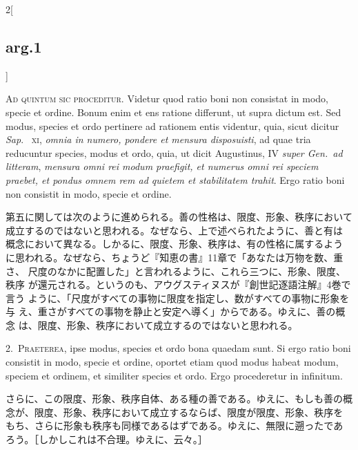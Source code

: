 \documentclass[paper=a4paper,fontsize=10pt,jafontsize=9pt,titlepage]{jlreq}
\begin{document}
\begin{paracol}{2}[\subsection{arg.1}]

{\huge A}{\scshape d quintum sic proceditur}. Videtur quod ratio boni
 non consistat in modo, specie et ordine. Bonum enim et ens ratione
 differunt, ut supra dictum est. Sed modus, species et ordo pertinere ad
 rationem entis videntur, quia, sicut dicitur {\itshape Sap}.~{\scshape
 xi}, {\itshape omnia in numero, pondere et mensura disposuisti}, ad
 quae tria reducuntur species, modus et ordo, quia, ut dicit Augustinus,
 IV {\itshape super Gen.~ad litteram}, {\itshape mensura omni rei modum
 praefigit, et numerus omni rei speciem praebet, et pondus omnem rem ad
 quietem et stabilitatem trahit}. Ergo ratio boni non consistit in modo,
 specie et ordine.

\switchcolumn

第五に関しては次のように進められる。善の性格は、限度、形象、秩序において
 成立するのではないと思われる。なぜなら、上で述べられたように、善と有は
 概念において異なる。しかるに、限度、形象、秩序は、有の性格に属するよう
 に思われる。なぜなら、ちょうど『知恵の書』11章で「あなたは万物を数、重さ、
 尺度のなかに配置した」と言われるように、これら三つに、形象、限度、秩序
 が還元される。というのも、アウグスティヌスが『創世記逐語注解』4巻で言う
 ように、「尺度がすべての事物に限度を指定し、数がすべての事物に形象を与
 え、重さがすべての事物を静止と安定へ導く」からである。ゆえに、善の概念
 は、限度、形象、秩序において成立するのではないと思われる。


2.~{\scshape Praeterea}, ipse modus, species et ordo bona quaedam sunt. Si ergo
 ratio boni consistit in modo, specie et ordine, oportet etiam quod
 modus habeat modum, speciem et ordinem, et similiter species et
 ordo. Ergo procederetur in infinitum.

\switchcolumn

さらに、この限度、形象、秩序自体、ある種の善である。ゆえに、もしも善の概
 念が、限度、形象、秩序において成立するならば、限度が限度、形象、秩序を
 もち、さらに形象も秩序も同様であるはずである。ゆえに、無限に遡ったであ
 ろう。［しかしこれは不合理。ゆえに、云々。］


\end{paracol}
\end{document}
